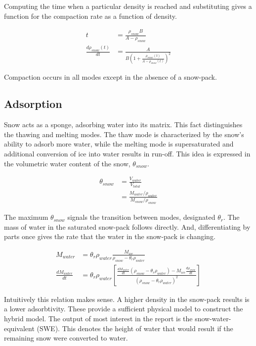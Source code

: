 \documentclass{article}
\begin{document}
Computing the time when a particular density is reached and
substituting gives a function for the compaction rate
as a function of density.

\begin{align}
t &= \frac{\rho_{snow} B}{A - \rho_{snow}} \\
\frac{d\rho_{snow}(t)}{dt} 
    &= \frac{A}{B (1 + \frac{\rho_{snow}(t)}{A - \rho_{snow}(t)})^2 }
    \label{eqn:compaction}
\end{align}

Compaction occurs in all modes except in the
absence of a snow-pack.


\subsection{Adsorption}

Snow acts as a sponge, adsorbing water into its matrix.
This fact distinguishes the thawing and melting modes.
The thaw mode is characterized by the snow's ability
to adsorb more water, while the melting mode is supersaturated
and additional conversion of ice into water results in run-off.
This idea is expressed in the volumetric water content of the snow,
$\theta_{snow}$.

\begin{align}
\theta_{snow} &= \frac{V_{water}}{V_{total}} \\
   &= \frac{M_{water}/ \rho_{water}}{M_{snow}/\rho_{snow}}
\end{align}
   
The maximum $\theta_{snow}$ signals the transition between 
modes, designated $\theta_{r}$.
The mass of water in the saturated snow-pack follows directly.
And, differentiating by parts once gives the rate that the water in the
snow-pack is changing.

\begin{align}
M_{water}  &= \theta_{r} \rho_{water} 
      \frac{M_{ice}}{\rho_{snow} - \theta_{r} \rho_{water}} \\
\frac{d M_{water}}{dt} &=  \theta_{r} \rho_{water}  
   \left[ \frac{\frac{d M_{water}}{dt} (\rho_{snow} - \theta_{r} \rho_{water})
                  - M_{ice} \frac{d \rho_{snow}}{dt} }
          {(\rho_{snow} - \theta_{r} \rho_{water})^2} \right]
          \label{eqn:saturation}
\end{align}

Intuitively this relation makes sense.
A higher density in the snow-pack results is a lower adsorbtivity.
These provide a sufficient physical model to construct the hybrid model.
The output of most interest in the report is the snow-water-equivalent (SWE).
This denotes the height of water that would result if the remaining
snow were converted to water.
\end{document}
